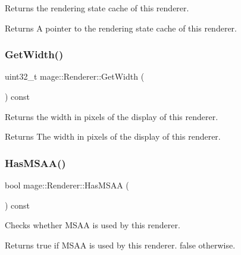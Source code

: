Returns the rendering state cache of this renderer.

\begin{DoxyReturn}{Returns}
A pointer to the rendering state cache of this renderer. 
\end{DoxyReturn}
\hypertarget{classmage_1_1_renderer_a140938e7d5f576163d39ce249ebda99f}{}\label{classmage_1_1_renderer_a140938e7d5f576163d39ce249ebda99f} 
\subsubsection{\texorpdfstring{Get\+Width()}{GetWidth()}}
{\footnotesize\ttfamily uint32\+\_\+t mage\+::\+Renderer\+::\+Get\+Width (\begin{DoxyParamCaption}{ }\end{DoxyParamCaption}) const\hspace{0.3cm}{\ttfamily [noexcept]}}

Returns the width in pixels of the display of this renderer.

\begin{DoxyReturn}{Returns}
The width in pixels of the display of this renderer. 
\end{DoxyReturn}
\hypertarget{classmage_1_1_renderer_a2ed9e9e39f01fa58769edd82ee1adcf8}{}\label{classmage_1_1_renderer_a2ed9e9e39f01fa58769edd82ee1adcf8} 
\subsubsection{\texorpdfstring{Has\+M\+S\+A\+A()}{HasMSAA()}}
{\footnotesize\ttfamily bool mage\+::\+Renderer\+::\+Has\+M\+S\+AA (\begin{DoxyParamCaption}{ }\end{DoxyParamCaption}) const\hspace{0.3cm}{\ttfamily [noexcept]}}

Checks whether M\+S\+AA is used by this renderer.

\begin{DoxyReturn}{Returns}
{\ttfamily true} if M\+S\+AA is used by this renderer. {\ttfamily false} otherwise. 
\end{DoxyReturn}
\hypertarget{classmage_1_1_renderer_a2bb7f4e41ef6db047ce3023ed4e5d0c1}{}\label{classmage_1_1_renderer_a2bb7f4e41ef6db047ce3023ed4e5d0c1} 
